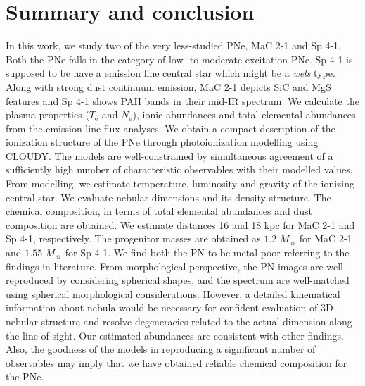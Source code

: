 \documentclass[a4paper,fleqn,usenatbib]{mnras}
\begin{document}
\section{Summary and conclusion} \label{sec:summary}
In this work, we study two of the very less-studied PNe, MaC 2-1 and Sp 4-1. Both the PNe falls in the category of low- to moderate-excitation PNe. Sp 4-1 is supposed to be have a emission line central star which might be a \textit{wels} type. Along with strong dust continuum emission, MaC 2-1 depicts SiC and MgS features and Sp 4-1 shows PAH bands in their mid-IR spectrum. We calculate the plasma properties ($T_\mathrm{e}$ and $N_\mathrm{e}$), ionic abundances and total elemental abundances from the emission line flux analyses. We obtain a compact description of the ionization structure of the PNe through photoionization modelling using CLOUDY. The models are well-constrained by simultaneous agreement of a sufficiently high number of characteristic observables with their modelled values. From modelling, we estimate temperature, luminosity and gravity of the ionizing central star. We evaluate nebular dimensions and its density structure. The chemical composition, in terms of total elemental abundances and dust composition are obtained. We estimate distances 16 and 18 kpc for MaC 2-1 and Sp 4-1, respectively. The progenitor masses are obtained as $1.2$ $M_{\sun}$ for MaC 2-1 and $1.55$ $M_{\sun}$ for Sp 4-1. We find both the PN to be metal-poor referring to the findings in literature. From morphological perspective, the PN images are well-reproduced by considering spherical shapes, and the spectrum are well-matched using spherical morphological considerations. However, a detailed kinematical information about nebula would be necessary for confident evaluation of 3D nebular structure and resolve degeneracies related to the actual dimension along the line of sight. Our estimated abundances are consistent with other findings. Also, the goodness of the models in reproducing a significant number of observables may imply that we have obtained reliable chemical composition for the PNe.           
 
\end{document}
